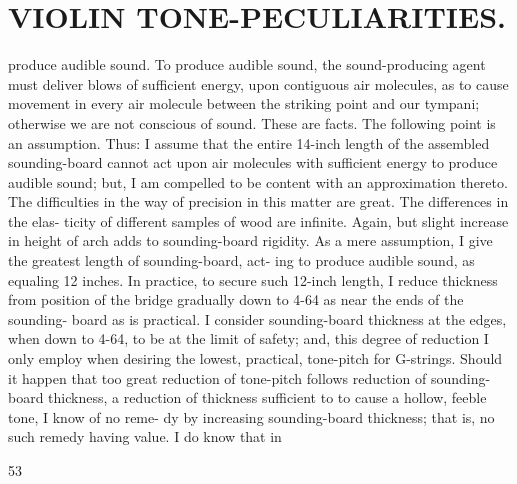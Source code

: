 \documentclass{article}
\begin{document}
\section*{VIOLIN TONE-PECULIARITIES.}
produce audible sound. To produce audible sound, the sound-producing agent must deliver blows of sufficient energy, upon contiguous air molecules, as to cause movement in every air molecule between the striking point and our tympani; otherwise we are not conscious of sound. These are facts. The following point is an assumption. Thus: I assume that the entire 14-inch length of the assembled sounding-board cannot act upon air molecules with sufficient energy to produce audible sound; but, I am compelled to be content with an approximation thereto. The difficulties in the way of precision in this matter are great. The differences in the elas- ticity of different samples of wood are infinite. Again, but slight increase in height of arch adds to sounding-board rigidity. As a mere assumption, I give the greatest length of sounding-board, act- ing to produce audible sound, as equaling 12 inches. In practice, to secure such 12-inch length, I reduce thickness from position of the bridge gradually down to 4-64 as near the ends of the sounding- board as is practical. I consider sounding-board thickness at the edges, when down to 4-64, to be at the limit of safety; and, this degree of reduction I only employ when desiring the lowest, practical, tone-pitch for G-strings. Should it happen that too great reduction of tone-pitch follows reduction of sounding-board thickness, a reduction of thickness sufficient to to cause a hollow, feeble tone, I know of no reme- dy by increasing sounding-board thickness; that is, no such remedy having value. I do know that in

53
\end{document}
